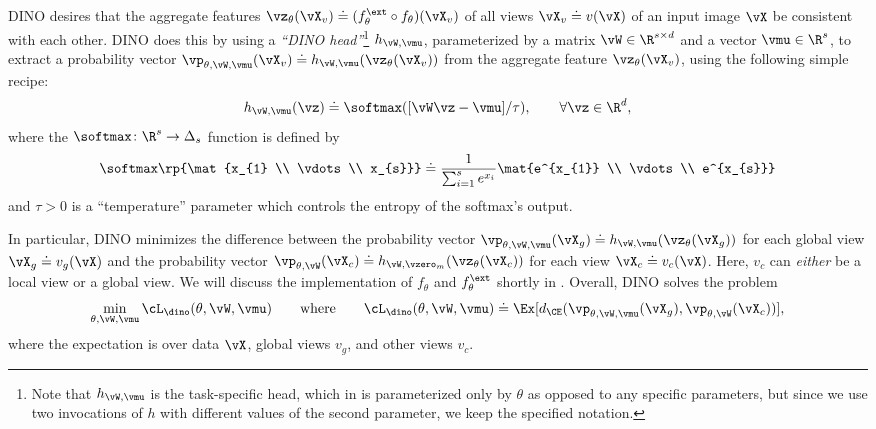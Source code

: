\documentclass[../../book-main.tex]{subfiles}
\begin{document}
DINO desires that the aggregate features \(\vz_{\theta}(\vX_{v}) \doteq (f_{\theta}^{\ext} \circ f_{\theta})(\vX_{v})\) of all views \(\vX_{v} \doteq v(\vX)\) of an input image \(\vX\) be consistent with each other. DINO does this by using a \textit{``DINO head''}\footnote{Note that \(h_{\vW, \vmu}\) is the task-specific head, which in  is parameterized only by \(\theta\) as opposed to any specific parameters, but since we use two invocations of \(h\) with different values of the second parameter, we keep the specified notation.} \(h_{\vW, \vmu}\), parameterized by a matrix \(\vW \in \R^{s \times d}\) and a vector \(\vmu \in \R^{s}\), to extract a probability vector \(\vp_{\theta, \vW, \vmu}(\vX_{v}) \doteq h_{\vW, \vmu}(\vz_{\theta}(\vX_{v}))\) from the aggregate feature \(\vz_{\theta}(\vX_{v})\), using the following simple recipe:
\begin{equation}
    h_{\vW, \vmu}(\vz) \doteq \softmax([\vW\vz - \vmu]/\tau), \qquad \forall \vz \in \R^{d},
\end{equation}
where the \(\softmax \colon \R^{s} \to \Delta_{s}\) function is defined by 
\begin{equation}
    \softmax\rp{\mat{x_{1} \\ \vdots \\ x_{s}}} \doteq \frac{1}{\sum_{i = 1}^{s}e^{x_{i}}}\mat{e^{x_{1}} \\ \vdots \\ e^{x_{s}}}
\end{equation}
and \(\tau > 0\) is a ``temperature'' parameter which controls the entropy of the softmax's output.

In particular, DINO minimizes the difference between the probability vector \(\vp_{\theta, \vW, \vmu}(\vX_{g}) \doteq h_{\vW, \vmu}(\vz_{\theta}(\vX_{g}))\) for each global view \(\vX_{g} \doteq v_{g}(\vX)\) and the probability vector \(\vp_{\theta, \vW}(\vX_{c}) \doteq h_{\vW, \vzero_{m}}(\vz_{\theta}(\vX_{c}))\) for each view \(\vX_{c} \doteq v_{c}(\vX)\). Here, \(v_{c}\) can \textit{either} be a local view or a global view. We will discuss the implementation of \(f_{\theta}\) and \(f_{\theta}^{\ext}\) shortly in . Overall, DINO solves the problem
 \begin{equation}\label{eq:dino_loss}
     \min_{\theta, \vW, \vmu}\cL_{\dino}(\theta, \vW, \vmu) \qquad \text{where} \qquad \cL_{\dino}(\theta, \vW, \vmu) \doteq \Ex[d_{\CE}(\vp_{\theta, \vW, \vmu}(\vX_{g}), \vp_{\theta, \vW}(\vX_{c}))],
\end{equation}
where the expectation is over data \(\vX\), global views \(v_{g}\), and other views \(v_{c}\).
\end{document}
